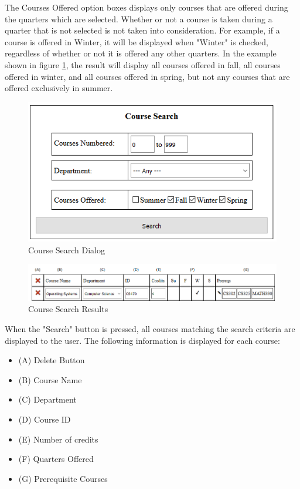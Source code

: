 \documentclass[]{article}
\begin{document}
		The Courses Offered option boxes displays only courses that are offered during the quarters which are selected. Whether or not a course is taken during a quarter that is not selected is not taken into consideration. For example, if a course is offered in Winter, it will be displayed when "Winter" is checked, regardless of whether or not it is offered any other quarters. In the example shown in figure \ref{searchcourses}, the result will display all courses offered in fall, all courses offered in winter, and all courses offered in spring, but not any courses that are offered exclusively in summer.
		\begin{figure}[H]
			\caption{Course Search Dialog}
			\label{searchcourses}
			\centering
			\includegraphics{coursesearch.PNG}
		\end{figure}
		\begin{figure}[H]
			\caption{Course Search Results}
			\label{coursedisplay}
			\includegraphics[width=\textwidth]{coursedisplay.PNG}
		\end{figure}
		When the "Search" button is pressed, all courses matching the search criteria are displayed to the user. The following information is displayed for each course:
		\begin{itemize}
			\item (A) Delete Button
			\item (B) Course Name
			\item (C) Department
			\item (D) Course ID
			\item (E) Number of credits
			\item (F) Quarters Offered
			\item (G) Prerequisite Courses
		\end{itemize}~\\
		
\end{document}
